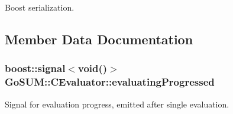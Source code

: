 Boost serialization. 



\subsection{Member Data Documentation}
\hypertarget{class_go_s_u_m_1_1_c_evaluator_ad7c33e830a5ebddbe7a0ddf873b615fe}{
\subsubsection[{evaluating\-Progressed}]{\setlength{\rightskip}{0pt plus 5cm}boost\-::signal$<$void()$>$ Go\-S\-U\-M\-::\-C\-Evaluator\-::evaluating\-Progressed}}\label{class_go_s_u_m_1_1_c_evaluator_ad7c33e830a5ebddbe7a0ddf873b615fe}


Signal for evaluation progress, emitted after single evaluation. 

